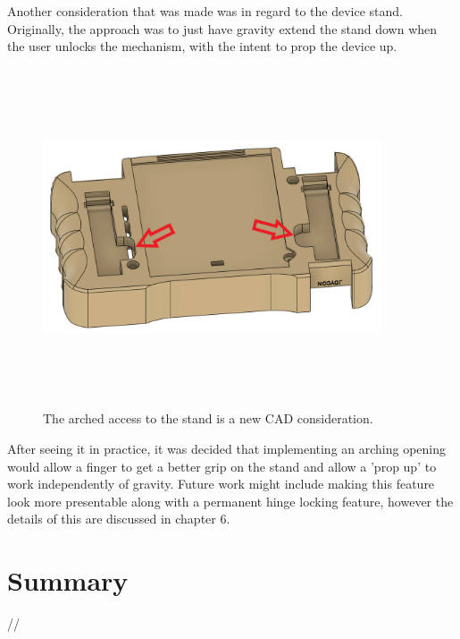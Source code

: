 Another consideration that was made was in regard to the device stand.
Originally, the approach was to just have gravity extend the stand down when the user unlocks the mechanism, with the intent to prop the device up.

\begin{figure} [h]
    \centering
    \includegraphics[width=10cm,height=10cm,keepaspectratio]{Figures/stand_new.png}
    \caption{The arched access to the stand is a new CAD consideration.}
    \label{fig:NewStand}
\end{figure}

After seeing it in practice, it was decided that implementing an arching opening would allow a finger to get a better grip on the stand and allow a 'prop up' to work independently of gravity.
Future work might include making this feature look more presentable along with a permanent hinge locking feature, however the details of this are discussed in chapter 6.


\section{Summary}
//